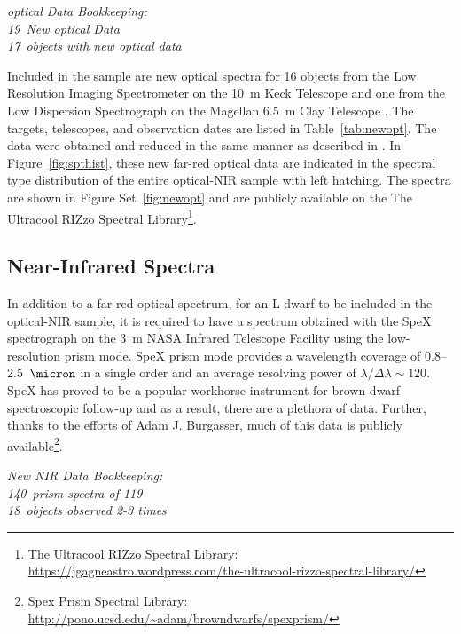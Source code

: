 \documentclass[12pt,preprint]{aastex}
\newcommand{\NewOptSpectra}{19} %
\newcommand{\NewOptObjects}{17} %
\newcommand{\NewPrismSpectra}{140} %
\newcommand{\dupes}{18} %
\newcommand{\NewPrismObjects}{119} %
\begin{document}
\label{sec:obs_new_opt}

\emph{optical Data Bookkeeping: \\
\NewOptSpectra~New optical Data\\
\NewOptObjects~objects with new optical data\\}

Included in the sample are new optical spectra for 16 objects from the Low Resolution Imaging Spectrometer on the 10~m Keck Telescope \citep[LRIS]{LRIS} and one from the Low Dispersion Spectrograph on the Magellan 6.5~m Clay Telescope \citep[LDSS-3]{LDSS2}.
The targets, telescopes, and observation dates are listed in Table~\ref{tab:newopt}. 
The data were obtained and reduced in the same manner as described in \citet{Kirkpatrick10}. 
In Figure~\ref{fig:spthist}, these new far-red optical data are indicated in the spectral type distribution of the entire optical-NIR sample with left hatching.
The spectra are shown in Figure Set~\ref{fig:newopt} and are publicly available on the The Ultracool RIZzo Spectral Library\footnote{The Ultracool RIZzo Spectral Library: \url{https://jgagneastro.wordpress.com/the-ultracool-rizzo-spectral-library/}}.

\subsection{Near-Infrared Spectra}

In addition to a far-red optical spectrum, for an L dwarf to be included in the optical-NIR sample, it is required to have a spectrum obtained with the SpeX spectrograph \citep{Spex} on the 3~m NASA Infrared Telescope Facility using the low-resolution prism mode.
SpeX prism mode provides a wavelength coverage of 0.8--2.5~$\micron$ in a single order and an average resolving power of $\lambda/\Delta\lambda\sim120$.
SpeX has proved to be a popular workhorse instrument for brown dwarf spectroscopic follow-up and as a result, there are a plethora of data. Further, thanks to the efforts of Adam J. Burgasser, much of this data is publicly available\footnote{Spex Prism Spectral Library: \url{http://pono.ucsd.edu/~adam/browndwarfs/spexprism/}}. 

\label{sec:obs_new_nir}

\emph{New NIR Data Bookkeeping: \\
\NewPrismSpectra~prism spectra of \NewPrismObjects \\
\dupes~objects observed 2-3 times}
\end{document}
